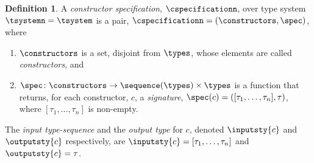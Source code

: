 \documentclass[a4paper]{article}
\theoremstyle{definition}
\newtheorem{definition}{Definition}
\begin{document}
		\begin{definition}\label{defn:constructionSpecification}
			A \textit{constructor specification}, $\cspecificationn$, over type system $\tsystemn=\tsystem$ is a pair, $\cspecificationn=(\constructors, \spec)$,  where
			\begin{enumerate}[itemsep=0pt,topsep=4pt]
				\item $\constructors$ is a set, disjoint from $\types$, whose elements are called \textit{constructors}, and
				\item $\spec\colon \constructors \to \sequence(\types)\times \types$ is a function that returns, for each constructor, $c$, a \textit{signature}, $\spec(c)=([\tau_1,\ldots,\tau_n], \tau)$, where $[\tau_1,\ldots,\tau_n]$ is non-empty.
			\end{enumerate}
			The \textit{input type-sequence} and the \textit{output type} for $c$, denoted $\inputsty{c}$ and $\outputsty{c}$ respectively, are $\inputsty{c}=[\tau_1,\ldots,\tau_n]$ and  $\outputsty{c}=\tau$.
		\end{definition}
	
	
\end{document}

